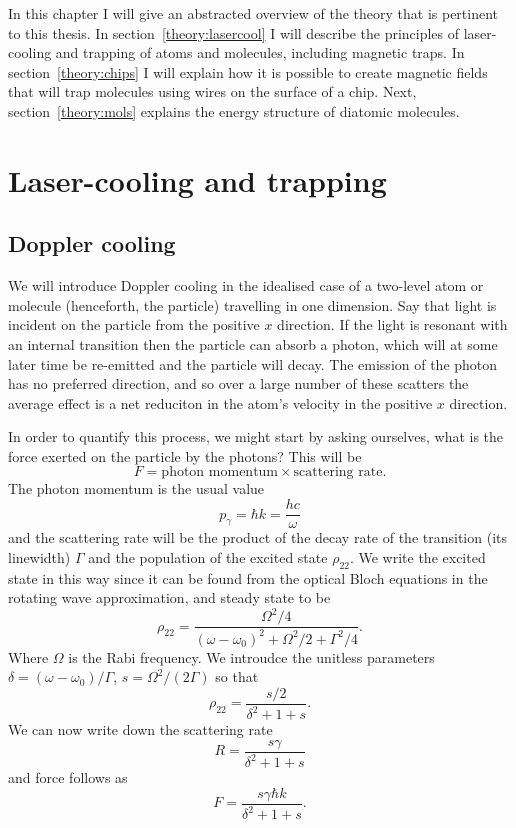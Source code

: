 In this chapter I will give an abstracted overview of the theory that is
pertinent to this thesis. In section~\ref{theory:lasercool} I will describe the
principles of laser-cooling and trapping of atoms and molecules, including
magnetic traps. In section~\ref{theory:chips} I will explain how it is possible
to create magnetic fields that will trap molecules using wires on the surface
of a chip. Next, section~\ref{theory:mols} explains the energy structure of
diatomic molecules.

\section{Laser-cooling and trapping}

\subsection{Doppler cooling}

We will introduce Doppler cooling in the idealised case of a two-level atom or
molecule (henceforth, the particle) travelling in one dimension.  Say that
light is incident on the particle from the positive $x$ direction. If the light
is resonant with an internal transition then the particle can absorb a photon,
which will at some later time be re-emitted and the particle will decay. The
emission of the photon has no preferred direction, and so over a large number
of these scatters the average effect is a net reduciton in the atom's velocity
in the positive $x$ direction.

In order to quantify this process, we might start by asking ourselves, what is
the force exerted on the particle by the photons? This will be~\cite{Foot2005}
%
\begin{equation}
  F = \text{photon momentum} \times \text{scattering rate}.
\end{equation}
%
The photon momentum is the usual value
%
\begin{equation}
  p_\gamma = \hbar k = \frac{hc}{\omega}
\end{equation}
%
and the scattering rate will be the product of the decay rate of the transition
(its linewidth) $\Gamma$ and the population of the excited state $\rho_{22}$.
We write the excited state in this way since it can be found from the optical
Bloch equations in the rotating wave approximation, and steady state to
be~\cite{Metcalf1999}
%
\begin{equation}
\rho_{22} = \frac{\Omega^2/4}{(\omega-\omega_0)^2 + \Omega^2/2 + \Gamma^2/4}.
\end{equation}
%
Where $\Omega$ is the Rabi frequency. We introudce the unitless parameters
$\delta = (\omega - \omega_0)/\Gamma$, $s=\Omega^2/(2\Gamma)$ so that
%
\begin{equation}
  \rho_{22} = \frac{s/2}{\delta^2 + 1 + s}.
\end{equation}
%
We can now write down the scattering rate
%
\begin{equation}
  R = \frac{s\gamma}{\delta^2 + 1 + s}
\end{equation}
%
and force follows as
%
\begin{equation}
  F = \frac{s\gamma\hbar k}{\delta^2 + 1 + s}.
\end{equation}


